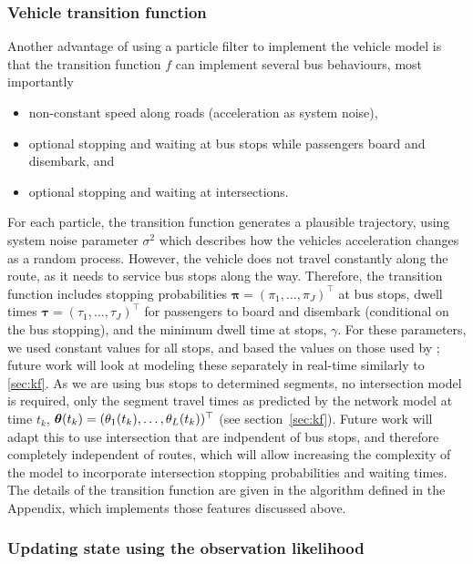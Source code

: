 \subsubsection{Vehicle transition function}
\label{sec:pf_prediction}

Another advantage of using a particle filter to implement the vehicle model is that
the transition function $f$ can implement several bus behaviours,
most importantly
\begin{itemize}
\item non-constant speed along roads (acceleration as system noise),
\item optional stopping and waiting at bus stops while passengers board and disembark, and
\item optional stopping and waiting at intersections.
\end{itemize}

For each particle, the transition function generates a plausible trajectory,
using system noise parameter $\sigma^2$ which describes 
how the vehicles acceleration changes as a random process.
However, the vehicle does not travel constantly along the route,
as it needs to service bus stops along the way.
Therefore, the transition function includes 
stopping probabilities $\boldsymbol\pi = (\pi_1,\ldots,\pi_J)^\top$ at bus stops,
dwell times $\boldsymbol\tau = (\tau_1,\ldots,\tau_J)^\top$ for passengers to
board and disembark (conditional on the bus stopping),
and the minimum dwell time at stops, $\gamma$.
For these parameters, we used constant values for all stops,
and based the values on those used by \cite{Hans_2015};
future work will look at modeling these separately in real-time similarly to \ref{sec:kf}.
As we are using bus stops to determined segments,
no intersection model is required,
only the segment travel times as predicted by the network model at time $t_k$,
$\boldsymbol{\theta}(t_k) = (\theta_1(t_k), \ldots, \theta_L(t_k))^\top$
(see section~\ref{sec:kf}).
Future work will adapt this to use intersection that are indpendent 
of bus stops, and therefore completely independent of routes,
which will allow increasing the complexity of the model to incorporate
intersection stopping probabilities and waiting times.
The details of the transition function are given in the algorithm defined in the Appendix,
which implements those features discussed above.



\subsubsection{Updating state using the observation likelihood}
\label{sec:pf_update}

